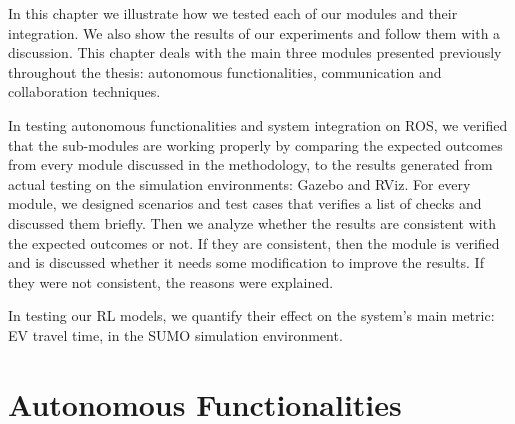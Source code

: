 In this chapter we illustrate how we tested each of our modules and their integration. We also show the results of our experiments and follow them with a discussion. This chapter deals with the main three modules presented previously throughout the thesis: autonomous functionalities, communication and collaboration techniques. 

In testing autonomous functionalities and system integration on ROS,
we verified that the sub-modules are working properly by comparing the expected outcomes from every module discussed in the methodology, to the results generated from actual testing on the simulation environments: Gazebo and RViz. For every module, we designed scenarios and test cases that verifies a list of checks and discussed them briefly. Then we analyze whether the results are consistent with the expected outcomes or not. If they are consistent, then the module is verified and is discussed whether it needs some modification to improve the results. If they were not consistent, the reasons were explained.

In testing our RL models, we quantify their effect on the system's main metric: EV travel time, in the SUMO simulation environment.


\label{SecProjTest}


\section{Autonomous Functionalities}
\label{sec:test_aut_func}

